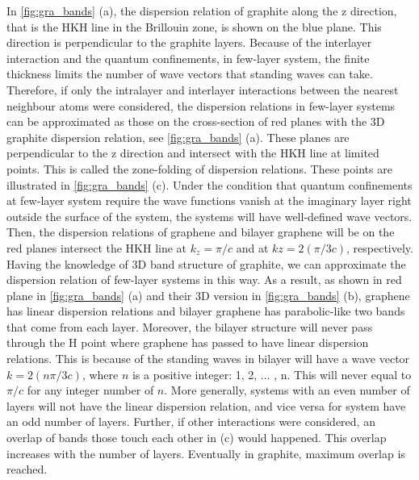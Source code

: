 In \autoref{fig:gra_bands} (a), the dispersion relation of graphite along the z direction, that is the HKH line in the Brillouin zone, is shown on the blue plane. This direction is perpendicular to the graphite layers. Because of the interlayer interaction and the quantum confinements, in few-layer system, the finite thickness limits the number of wave vectors that standing waves can take.  Therefore, if only the intralayer and interlayer interactions between the nearest neighbour atoms were considered, the dispersion relations in few-layer systems can be approximated as those on the cross-section of red planes with the 3D graphite dispersion relation, see \autoref{fig:gra_bands} (a).  These planes are perpendicular to the z direction and intersect with the HKH line at limited points. This is called the zone-folding of dispersion relations\cite{saito1998physical}. These points are illustrated in \autoref{fig:gra_bands} (c). Under the condition that quantum confinements at few-layer system require the wave functions vanish at the imaginary layer right outside the surface of the system, the systems will have well-defined wave vectors. Then, the dispersion relations of graphene and bilayer graphene will be on the red planes intersect the HKH line at $k_z=\pi/c$ and at $kz=2(\pi/3c)$, respectively.  Having the knowledge of 3D band structure of graphite, we can approximate the dispersion relation of few-layer systems in this way. As a result, as shown in red plane in \autoref{fig:gra_bands} (a) and their 3D version in \autoref{fig:gra_bands} (b), graphene has linear dispersion relations and bilayer graphene has parabolic-like two bands that come from each layer. Moreover, the bilayer structure will never pass through the H point where graphene has passed to have linear dispersion relations. This is because of the standing waves in bilayer will have a wave vector $k=2(n \pi/3c)$, where $n$ is a positive integer: 1, 2, ... , n. This will never equal to $\pi/c$ for any integer number of $n$. More generally, systems with an even number of layers will not have the linear dispersion relation, and vice versa for system have an odd number of layers. Further, if other interactions were considered, an overlap of bands those touch each other in (c) would happened\cite{Partoens2006}. This overlap increases with the number of layers. Eventually in graphite, maximum overlap is reached.


